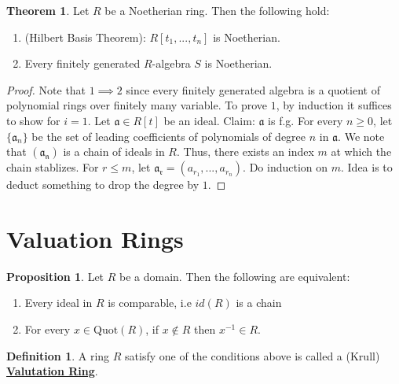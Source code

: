\documentclass{article}
\theoremstyle{definition}
\newtheorem{theorem}{Theorem}[section]
\theoremstyle{definition}
\theoremstyle{definition}
\newtheorem{proposition}{Proposition}[section]
\theoremstyle{definition}
\theoremstyle{definition}
\newtheorem{definition}{Definition}[section]
\theoremstyle{definition}
\theoremstyle{definition}
\begin{document}
\begin{tcolorbox}[colback=red!5!white,colframe=red!30!white]
\begin{theorem}
Let $R$ be a Noetherian ring. Then the following hold:
\begin{enumerate}
    \item (Hilbert Basis Theorem): $R[t_1,...,t_n]$ is Noetherian. 
    \item Every finitely generated $R$-algebra $S$ is Noetherian. 
\end{enumerate}
\end{theorem}
\end{tcolorbox}
\begin{proof}
    Note that $1\implies 2$ since every finitely generated algebra is a quotient of polynomial rings over finitely many variable. To prove $1$, by induction it suffices to show for $i=1$. Let $\mathfrak{a}\in R[t]$ be an ideal. Claim: $\mathfrak{a}$ is f.g. For every $n\geq 0$, let $\{\mathfrak{a}_n\}$ be the set of leading coefficients of polynomials of degree $n$ in $\mathfrak{a}$. We note that $(\mathfrak{a_n})$ is a chain of ideals in $R$. Thus, there exists an index $m$ at which the chain stablizes. For $r\leq m$, let $\mathfrak{a_r}=(a_{r_1},...,a_{r_n})$.  Do induction on $m$. Idea is to deduct something to drop the degree by $1$. 
 
\end{proof}

\section{Valuation Rings}


\begin{tcolorbox}[colback=blue!5!white,colframe=blue!30!white]
\begin{proposition}
    Let $R$ be a domain. Then the following are equivalent:
    \begin{enumerate}
        \item Every ideal in $R$ is comparable, i.e $id(R)$ is a chain
        \item For every $x\in \textrm{Quot}(R)$, if $x\not \in R$ then $x^{-1}\in R$. 
    \end{enumerate}
\end{proposition}
\end{tcolorbox}


\begin{tcolorbox}[colback=purple!5!white,colframe=purple!75!black]
\begin{definition}
A ring $R$ satisfy one of the conditions above is called a (Krull) \underline{\textbf{Valutation Ring}}.
\end{definition}
\end{tcolorbox}
\end{document}
